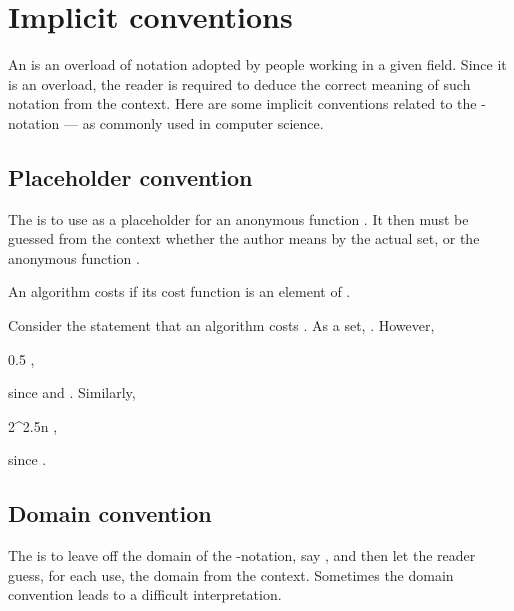 \documentclass[b5paper, english, oneside]{memoir}
\begin{document}
\section{Implicit conventions}
\label{ImplicitConventions}

An  is an overload of notation adopted by people working in a given field. Since it is an overload, the reader is required to deduce the correct meaning of such notation from the context. Here are some implicit conventions related to the -notation --- as commonly used in computer science.

\subsection{Placeholder convention}

\begin{definition}
The  is to use  as a placeholder for an anonymous function . It then must be guessed from the context whether the author means by  the actual set, or the anonymous function . 
\end{definition}

\begin{example}
An algorithm costs  if its cost function is an element of .
\end{example}

\begin{example}
Consider the statement that an algorithm costs . As a set, . However,
\begin{eqs}
0.5 \in {},
\end{eqs}
since  and . Similarly,
\begin{eqs}
2^{2.5n} \in {},
\end{eqs}
since . 
\end{example}











\subsection{Domain convention}

\begin{definition}
The  is to leave off the domain of the -notation, say , and then let the reader guess, for each use, the domain from the context. Sometimes the domain convention leads to a difficult interpretation. 
\end{definition}
\end{document}
